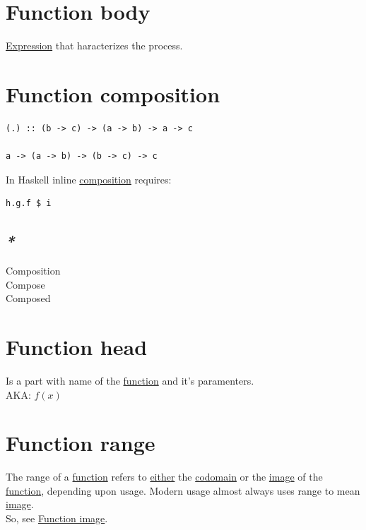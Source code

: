 \documentclass[a4paper,14pt,oneside]{book}
\begin{document}
\section{\label{orge6e88d2}Function body}
\label{sec:org8d86855}
\hyperref[org3ea9088]{Expression} that haracterizes the process.\\

\section{\label{orgfdd9b21}Function composition}
\label{sec:org14f0077}
\begin{verbatim}
(.) :: (b -> c) -> (a -> b) -> a -> c

a -> (a -> b) -> (b -> c) -> c
\end{verbatim}

In Haskell inline \hyperref[orgcf7d368]{composition} requires:\\
\begin{verbatim}
h.g.f $ i
\end{verbatim}

\subsection{\emph{*}}
\label{sec:orge0a09f6}

\label{org770eda0}Composition\\
\label{orge8e56ac}Compose\\
\label{orga7b369a}Composed\\

\section{\label{org2bb40ab}Function head}
\label{sec:org4838bae}
Is a part with name of the \hyperref[orge00b05b]{function} and it's paramenters.\\
AKA: \(f(x)\)\\

\section{\label{org420ad1a}Function range}
\label{sec:orgd1d41be}
The range of a \hyperref[orge00b05b]{function} refers to \hyperref[orgc7cff38]{either} the \hyperref[org2fb83bf]{codomain} or the \hyperref[org2ba15d0]{image} of the \hyperref[orge00b05b]{function}, depending upon usage. Modern usage almost always uses range to mean \hyperref[org2ba15d0]{image}.\\
So, see \hyperref[org2dbce2a]{Function image}.\\
\end{document}
